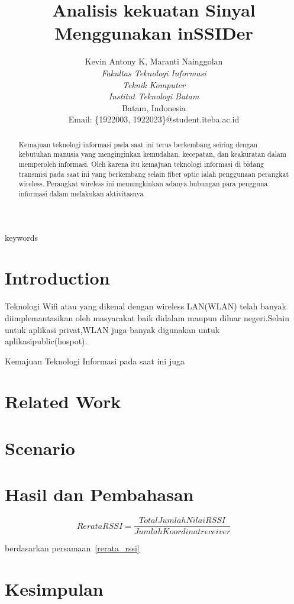 \documentclass[conference]{IEEEtran}
\title{Analisis kekuatan Sinyal Menggunakan inSSIDer}
\author{Kevin Antony K\IEEEauthorrefmark{1}, Maranti Nainggolan\IEEEauthorrefmark{2}\\
\textit{Fakultas Teknologi Informasi}\\
\textit{Teknik Komputer}\\
\textit{Institut Teknologi Batam}\\
Batam, Indonesia\\
Email: \{\IEEEauthorrefmark{1}1922003, \IEEEauthorrefmark{2}1922023\}@student.iteba.ac.id}
\begin{document}
\maketitle

\begin{abstract}
    
    Kemajuan teknologi informasi pada saat ini
terus berkembang seiring dengan kebutuhan manusia yang
menginginkan kemudahan, kecepatan, dan keakuratan dalam
memperoleh informasi. Oleh karena itu kemajuan teknologi
informasi di bidang transmisi pada saat ini yang berkembang
selain fiber optic ialah penggunaan perangkat wireless. Perangkat
wireless ini memungkinkan adanya hubungan para pengguna
informasi dalam melakukan aktivitasnya
\end{abstract}

\begin{IEEEkeywords}
    keywords
\end{IEEEkeywords}

\section{Introduction}
Teknologi Wifi atau yang dikenal dengan wireless LAN(WLAN) telah banyak diimplemantasikan 
oleh masyarakat baik didalam maupun diluar negeri.Selain untuk aplikasi privat,WLAN 
juga banyak digunakan untuk aplikasipublic(hospot).\

Kemajuan Teknologi Informasi pada saat ini juga 


\section{Related Work}

\section{Scenario}

\begin{figure}[htbp]
    
\end{figure}

\section{Hasil dan Pembahasan}

\begin{equation}
    Rerata RSSI = \frac{Total Jumlah Nilai RSSI}{Jumlah Koordinat receiver}
    \label{rerata_rssi}
\end{equation}

berdasarkan persamaan~\ref{rerata_rssi}

\section{Kesimpulan}



\end{document}
